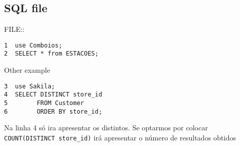 \documentclass[11pt]{article}
\begin{document}
\subsection{SQL file}
\label{sec:org627005a}
FILE::

\begin{verbatim}
1  use Comboios;
2  SELECT * from ESTACOES;
\end{verbatim}

Other example
\begin{verbatim}
3  use Sakila;
4  SELECT DISTINCT store_id
5        FROM Customer
6        ORDER BY store_id;
\end{verbatim}

Na linha 4 só ira apresentar os distintos.
Se optarmos por colocar \texttt{COUNT(DISTINCT store\_id)} irá apresentar o número de resultados obtidos
\end{document}

